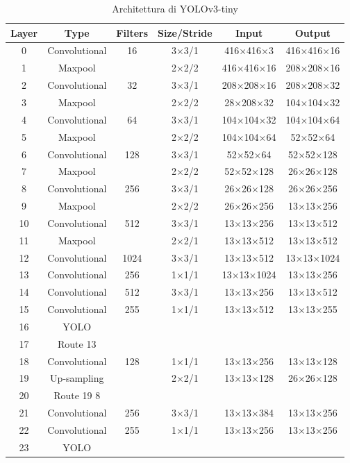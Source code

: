 \documentclass[a4paper]{article}
\begin{document}
	\begin{table}[htpb]
		\centering
		\begin{tabular}{ c c c c c c }
			\hline
			\textbf{Layer} & \textbf{Type} & \textbf{Filters} & \textbf{Size/Stride} & \textbf{Input} & \textbf{Output} \\ \hline
			0 & Convolutional & 16 & 3×3/1 & 416×416×3 & 416×416×16 \\
			1 & Maxpool && 2×2/2 & 416×416×16 & 208×208×16\\
			2 & Convolutional & 32 & 3×3/1 & 208×208×16&208×208×32\\
			3 & Maxpool & & 2×2/2 & 28×208×32 & 104×104×32 \\
			4 & Convolutional & 64 & 3×3/1 & 104×104×32 & 104×104×64\\
			5 & Maxpool & & 2×2/2 & 104×104×64 & 52×52×64\\
			6 & Convolutional & 128 & 3×3/1 & 52×52×64 & 52×52×128\\
			7 & Maxpool & & 2×2/2 & 52×52×128 & 26×26×128\\
			8 & Convolutional & 256 & 3×3/1 & 26×26×128 & 26×26×256\\
			9 & Maxpool & & 2×2/2 & 26×26×256 & 13×13×256\\
			10 & Convolutional & 512 & 3×3/1 & 13×13×256 & 13×13×512\\
			11 & Maxpool & & 2×2/1 & 13×13×512 & 13×13×512\\
			12 & Convolutional & 1024 & 3×3/1 & 13×13×512 & 13×13×1024\\
			13 & Convolutional & 256 & 1×1/1 & 13×13×1024 & 13×13×256\\
			14 & Convolutional & 512 & 3×3/1 & 13×13×256 & 13×13×512\\
			15 & Convolutional & 255 & 1×1/1 & 13×13×512 & 13×13×255\\
			16 & YOLO&&&&\\
			17 & Route 13&&&&\\
			18 & Convolutional & 128 & 1×1/1 & 13×13×256 & 13×13×128\\
			19 & Up‐sampling && 2×2/1 & 13×13×128 & 26×26×128\\
			20 & Route 19 8&&&&\\
			21 & Convolutional & 256 & 3×3/1 & 13×13×384 & 13×13×256\\
			22 & Convolutional & 255 & 1×1/1 & 13×13×256 & 13×13×256\\
			23 & YOLO &&&&\\\hline
		\end{tabular}
	    \caption{Architettura di YOLOv3-tiny}
	\label{tab:yolotiny}
	\end{table}
\end{document}
